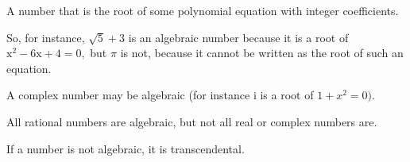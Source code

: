 A number that is the root of some polynomial equation with integer coefficients.
\par
So, for instance, $ \sqrt {5} + 3 $ is an algebraic number because it is a
root of $ \mathrm{x}^2 - 6 \mathrm{x} + 4 = 0, $ but 
$ \pi $ is not, because it cannot be written
as the root of such an equation.
\par
A complex number may be algebraic (for instance i is a root of $1+x^{2}=0).$ 
\par
All rational numbers are algebraic, but not all real or complex numbers are.
\par
If a number is not algebraic, it is transcendental.